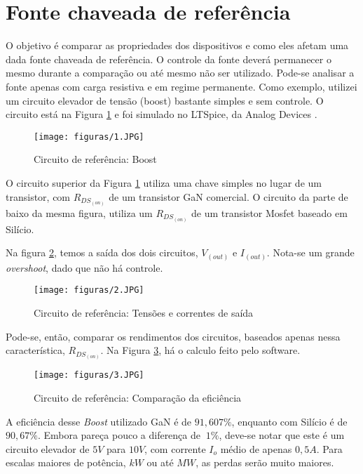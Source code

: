 \section{Fonte chaveada de referência}
O objetivo é comparar as propriedades dos dispositivos e como eles afetam uma dada fonte chaveada de referência. O controle da fonte deverá permanecer o mesmo durante a comparação ou até mesmo não ser utilizado. Pode-se analisar a fonte apenas com carga resistiva e em regime permanente. Como exemplo, utilizei um circuito elevador de tensão (boost) bastante simples e sem controle. O circuito está na Figura \ref{FigCircuit} e foi simulado no LTSpice, da Analog Devices \cite{ltspice}.
\begin{figure}[H]
\caption{Circuito de referência: Boost}
 \centering %
\texttt{[image: figuras/1.JPG]} 
\label{FigCircuit}
\end{figure}
\noindent O circuito superior da Figura \ref{FigCircuit} utiliza uma chave simples no lugar de um transistor, com $R_{DS_{(on)}}$ de um transistor GaN comercial. O circuito da parte de baixo da mesma figura, utiliza um $R_{DS_{(on)}}$ de um transistor Mosfet baseado em Silício.\par
\noindent Na figura \ref{FigCircuitVoutIout}, temos a saída dos dois circuitos, $V_{(out)}$ e $I_{(out)}$. Nota-se um grande \textit{overshoot}, dado que não há controle.
\begin{figure}[H]
\caption{Circuito de referência: Tensões e correntes de saída}
 \centering %
\texttt{[image: figuras/2.JPG]} 
\label{FigCircuitVoutIout}
\end{figure}
\noindent Pode-se, então, comparar os rendimentos dos circuitos, baseados apenas nessa característica, $R_{DS_{(on)}}$. Na Figura \ref{FigCircuitEff}, há o calculo feito pelo software. 
\begin{figure}[H]
\caption{Circuito de referência: Comparação da eficiência}
 \centering %
\texttt{[image: figuras/3.JPG]} 
\label{FigCircuitEff}
\end{figure}
\noindent A eficiência desse \textit{Boost} utilizado GaN é de $91,607\%$, enquanto com Silício é de $90,67\%$. Embora pareça pouco a diferença de $~1\%$, deve-se notar que este é um circuito elevador de $5V$ para $10V$, com corrente $I_o$ médio de apenas $0,5A$. Para escalas maiores de potência, $kW$ ou até $MW$, as perdas serão muito maiores.

